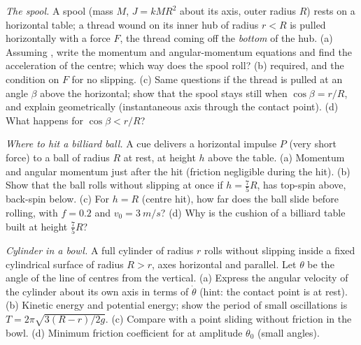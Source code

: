\begin{exercise}[$\star\star\star$]\label{exo:b2:rigid-body-mechanics:10}
\emph{The spool.} A spool (mass $M$,  $J = kMR^2$ about
its axis, outer radius $R$) rests on a horizontal table; a thread wound
on its inner hub of radius $r < R$ is pulled horizontally with a force
$F$, the thread coming off the \emph{bottom} of the hub. (a) Assuming
, write the momentum and angular-momentum
equations and find the acceleration of the centre; which way does the
spool roll? (b)  required, and the condition on $F$ for
no slipping. (c) Same questions if the thread is pulled at an angle
$\beta$ above the horizontal; show that the spool stays still when
$\cos\beta = r/R$, and explain geometrically (instantaneous axis through
the contact point). (d) What happens for $\cos\beta < r/R$?
\end{exercise}

\begin{exercise}[$\star\star\star$]\label{exo:b2:rigid-body-mechanics:11}
\emph{Where to hit a billiard ball.} A cue delivers a horizontal
impulse $P$ (very short force) to a ball of radius $R$ at rest, at
height $h$ above the table. (a) Momentum and angular momentum just after
the hit (friction negligible during the hit). (b) Show that the ball
rolls without slipping at once if $h = \tfrac75R$, has top-spin above,
back-spin below. (c) For $h = R$ (centre hit), how far does the ball
slide before rolling, with $f = 0.2$ and $v_0 = \qty{3}{m/s}$? (d) Why is
the cushion of a billiard table built at height $\tfrac75R$?
\end{exercise}

\begin{exercise}[$\star\star\star$]\label{exo:b2:rigid-body-mechanics:12}
\emph{Cylinder in a bowl.} A full cylinder of radius $r$ rolls without
slipping inside a fixed cylindrical surface of radius $R > r$, axes
horizontal and parallel. Let $\theta$ be the angle of the line of
centres from the vertical. (a) Express the angular velocity of the
cylinder about its own axis in terms of $\dot\theta$ (hint: the contact
point is at rest). (b) Kinetic energy and potential energy; show the
period of small oscillations is $T = 2\pi\sqrt{3(R - r)/2g}$. (c) Compare
with a point sliding without friction in the bowl. (d) Minimum friction
coefficient for  at amplitude $\theta_0$
(small angles).
\end{exercise}

